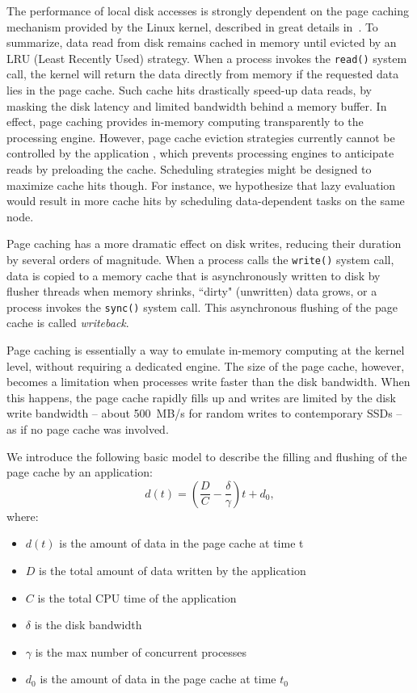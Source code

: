 \documentclass{IEEEtran}
\newcommand{\todo}[1]{\marginpar{\parbox{18mm}{\flushleft\tiny\color{red}\textbf{TODO}:
      #1}}}
\begin{document}
The performance of local disk accesses is strongly dependent on the 
page caching mechanism provided by the Linux kernel, described in great 
details in~\cite{love2010linux}. To summarize, data read from disk 
remains cached in memory until evicted by an LRU (Least Recently Used) 
strategy. When a process invokes the \texttt{read()} system call, the 
kernel will return the data directly from memory if the requested data 
lies in the page cache. Such cache hits drastically speed-up data 
reads, by masking the disk latency and limited bandwidth behind a 
memory buffer. In effect, page caching provides in-memory computing 
transparently to the processing engine. However, page cache eviction 
strategies currently cannot be controlled by the application 
\todo{check that}, which prevents processing engines to anticipate 
reads by preloading the cache. Scheduling strategies might be designed 
to maximize cache hits though. For instance, we hypothesize that lazy 
evaluation would result in more cache hits by scheduling data-dependent 
tasks on the same node.

Page caching has a more dramatic effect on disk writes, reducing their 
duration by several orders of magnitude. When a process calls the 
\texttt{write()} system call, data is copied to a memory cache that is 
asynchronously written to disk by flusher threads when memory shrinks, 
``dirty" (unwritten) data grows, or a 
process invokes the \texttt{sync()} system call. 
This asynchronous flushing of the page cache is called 
\emph{writeback}.

Page caching is essentially a way to 
emulate in-memory computing at the kernel level, without requiring a 
dedicated engine. The size of the page cache, however, becomes a 
limitation when processes write faster than the disk bandwidth. When 
this happens, the page cache rapidly fills up and writes are limited by 
the disk write bandwidth -- about 500~MB/s for random writes to 
contemporary SSDs  -- as if no page cache was involved.

We introduce the following basic model to describe the filling and 
flushing of the page cache by an application:
$$
d(t) = \left( \frac{D}{C} - \frac{\delta}{\gamma} \right)t + d_0,
$$
where:
\begin{itemize}
\item $d(t)$ is the amount of data in the page cache at time t
\item $D$ is the total amount of data written by the application
\item $C$ is the total CPU time of the application
\item $\delta$ is the disk bandwidth
\item $\gamma$ is the max number of concurrent processes
\item $d_0$ is the amount of data in the page cache at time $t_0$
\end{itemize}
\end{document}
